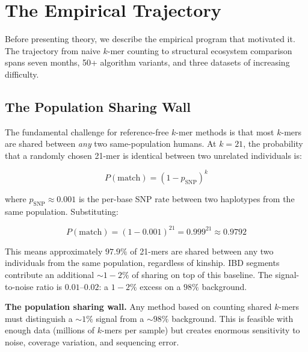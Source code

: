 \documentclass{../yalumba}
\begin{document}
\section{The Empirical Trajectory}
\label{sec:trajectory}

Before presenting theory, we describe the empirical program that
motivated it.  The trajectory from naive $k$-mer counting to structural
ecosystem comparison spans seven months, 50+ algorithm variants, and
three datasets of increasing difficulty.

\subsection{The Population Sharing Wall}
\label{sec:trajectory:wall}

The fundamental challenge for reference-free $k$-mer methods is that
most $k$-mers are shared between \emph{any} two same-population humans.
At $k = 21$, the probability that a randomly chosen 21-mer is identical
between two unrelated individuals is:

\begin{equation}
  P(\text{match}) = (1 - p_{\text{SNP}})^k
  \label{eq:pmatch}
\end{equation}

where $p_{\text{SNP}} \approx 0.001$ is the per-base SNP rate between
two haplotypes from the same population.  Substituting:

\begin{equation}
  P(\text{match}) = (1 - 0.001)^{21} = 0.999^{21} \approx 0.9792
  \label{eq:pmatch_val}
\end{equation}

This means approximately $97.9\%$ of 21-mers are shared between any two
individuals from the same population, regardless of kinship.  IBD
segments contribute an additional ${\sim}1{-}2\%$ of sharing on top of
this baseline.  The signal-to-noise ratio is $0.01$--$0.02$: a $1{-}2\%$
excess on a $98\%$ background.

\begin{limitation}
\textbf{The population sharing wall.}  Any method based on counting
shared $k$-mers must distinguish a ${\sim}1\%$ signal from a
${\sim}98\%$ background.  This is feasible with enough data (millions of
$k$-mers per sample) but creates enormous sensitivity to noise, coverage
variation, and sequencing error.
\end{limitation}
\end{document}
